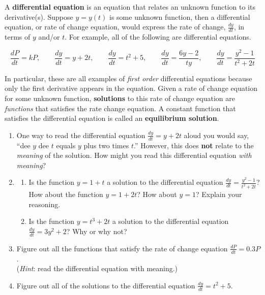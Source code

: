 \clearpage
 

A {\bf differential equation} is an equation that relates an unknown function to its derivative(s). Suppose $y = y(t)$ is some unknown function, then a differential equation, or rate of change equation, would express the rate of change, $\frac{dy}{dt}$, in terms of $y$ and/or $t$. For example, all of the following are differential equations.  

\[ \frac{dP}{dt}=kP,\qquad \frac{dy}{dt}=y+2t, \qquad \frac{dy}{dt}=t^2+5,\qquad \frac{dy}{dt}=\frac{6y-2}{ty}, \qquad \frac{dy}{dt}=\frac{y^2-1}{t^2+2t}
\]

In particular, these are all examples of \textit{first order} differential equations because only the first derivative appears in the equation. Given a rate of change equation for some unknown function, \textbf{solutions} to this rate of change equation are \textsl{functions} that satisfies the rate change equation. A constant function that satisfies the differential equation is called an \textbf{equilibrium solution}.
\begin{enumerate}[resume]
\item One way to read the differential equation $\frac{dy}{dt} = y+2t$ aloud you would say, ``dee $y$ dee $t$ equals $y$ plus two times $t$.'' However, this does \textbf{not} relate to the \textsl{meaning} of the solution.  How might you read this differential equation \textsl{with meaning}? \vfill

\item \begin{enumerate}
\item Is the function $y=1+t$  a solution to the differential equation $\displaystyle\frac{dy}{dt}=\frac{y^2-1}{t^2+2t}$? How about the function $y=1+2t$?  How about $y = 1$?  Explain your reasoning. \label{01problem4parta} \vfill 

\item	Is the function $y=t^3+2t$    a solution to the differential equation $\displaystyle \frac{dy}{dt}=3y^2+2$?  Why or why not? \label{01problem4partb} \vfill

\end{enumerate}

\item	Figure out all the functions that satisfy the rate of change equation $\displaystyle \frac{dP}{dt}=0.3P$. \\(\textsl{Hint}: read the differential equation with meaning.) \label{01problem5} \vfill

\item	Figure out all of the solutions to the differential equation $\displaystyle\frac{dy}{dt}=t^2+5$. \label{01problem6} \vfill
\end{enumerate}

